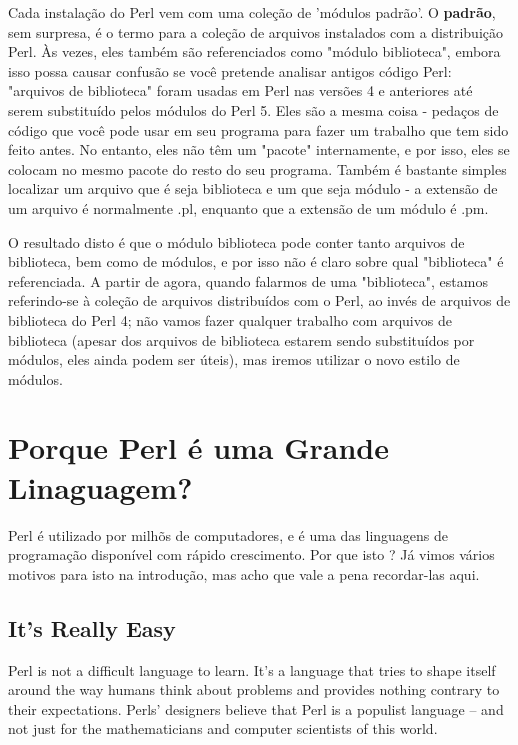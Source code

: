 \documentclass[a4paper,11pt]{book}
\begin{document}
\noindent 

\noindent Cada instalação do Perl vem com uma coleção de 'módulos padrão'. O \textbf{padrão}, sem surpresa, é o termo para a cole\c{c}ão de arquivos instalados com a distribuição Perl. Às vezes, eles também são referenciados como "módulo biblioteca", embora isso possa causar confusão se você pretende analisar antigos código Perl: "arquivos de biblioteca" foram usadas em Perl nas versões 4 e anteriores até serem substituído pelos módulos do Perl 5. Eles são a mesma coisa - pedaços de código que você pode usar em seu programa para fazer um trabalho que tem sido feito antes. No entanto, eles não têm um "pacote" internamente, e por isso, eles se colocam no mesmo pacote do resto do seu programa. Também é bastante simples localizar um arquivo que é seja biblioteca e um que seja módulo - a extensão de um arquivo é normalmente .pl, enquanto que a extensão de um módulo é .pm.

\noindent 

\noindent O resultado disto é que o módulo biblioteca pode conter tanto arquivos de biblioteca, bem como de módulos, e por isso não é claro sobre qual "biblioteca" é referenciada. A partir de agora, quando falarmos de uma "biblioteca", estamos referindo-se à coleção de arquivos distribuídos com o Perl, ao invés de arquivos de biblioteca do Perl 4; não vamos fazer qualquer trabalho com arquivos de biblioteca (apesar dos arquivos de biblioteca estarem sendo substituídos por módulos, eles ainda podem ser úteis), mas iremos utilizar o novo estilo de módulos.

\noindent 

\section{Porque Perl é uma Grande Linaguagem?}

\noindent Perl é utilizado por milhõs de computadores, e é uma das linguagens de programação disponível com rápido crescimento. Por que isto ? Já vimos vários motivos para isto na introdução, mas acho que vale a pena recordar-las aqui.

\subsection{It's Really Easy}

\noindent Perl is not a difficult language to learn. It's a language that tries to shape itself around the way humans think about problems and provides nothing contrary to their expectations. Perls' designers believe that Perl is a populist language -- and not just for the mathematicians and computer scientists of this world.
\end{document}
